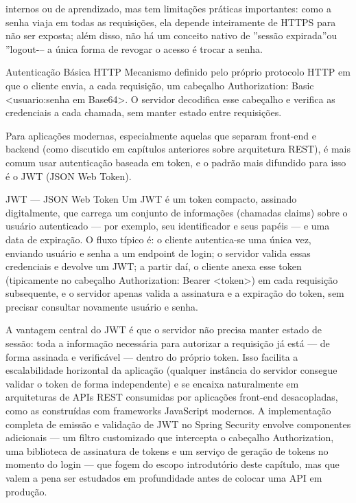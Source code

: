 internos ou de aprendizado, mas tem limitações práticas importantes: como a senha viaja em todas as requisições, ela depende inteiramente de HTTPS para não ser exposta; além disso, não há um conceito nativo de ”sessão expirada”ou ”logout-– a única forma de revogar o acesso é trocar a senha.

\begin{codebox}{Autenticação Básica HTTP}
Mecanismo definido pelo próprio protocolo HTTP em que o cliente envia,
a cada requisição, um cabeçalho Authorization: Basic <usuario:senha em
Base64>. O servidor decodifica esse cabeçalho e verifica as credenciais a cada
chamada, sem manter estado entre requisições.
\end{codebox}

Para aplicações modernas, especialmente aquelas que separam front-end e backend (como discutido em capítulos anteriores sobre arquitetura REST), é mais comum usar autenticação baseada em token, e o padrão mais difundido para isso é o JWT (JSON Web Token).

\begin{codebox}{JWT — JSON Web Token}
Um JWT é um token compacto, assinado digitalmente, que carrega um conjunto
de informações (chamadas claims) sobre o usuário autenticado — por exemplo,
seu identificador e seus papéis — e uma data de expiração. O fluxo típico é:
o cliente autentica-se uma única vez, enviando usuário e senha a um endpoint
de login; o servidor valida essas credenciais e devolve um JWT; a partir daí,
o cliente anexa esse token (tipicamente no cabeçalho Authorization: Bearer
<token>) em cada requisição subsequente, e o servidor apenas valida a assinatura
e a expiração do token, sem precisar consultar novamente usuário e senha.
\end{codebox}

A vantagem central do JWT é que o servidor não precisa manter estado de sessão: toda a informação necessária para autorizar a requisição já está — de forma assinada e verificável — dentro do próprio token. Isso facilita a escalabilidade horizontal da aplicação (qualquer instância do servidor consegue validar o token de forma independente) e se encaixa naturalmente em arquiteturas de APIs REST consumidas por aplicações front-end desacopladas, como as construídas com frameworks JavaScript modernos. A implementação completa de emissão e validação de JWT no Spring Security envolve componentes adicionais — um filtro customizado que intercepta o cabeçalho Authorization, uma biblioteca de assinatura de tokens e um serviço de geração de tokens no momento do login — que fogem do escopo introdutório deste capítulo, mas que valem a pena ser estudados em profundidade antes de colocar uma API em produção.


